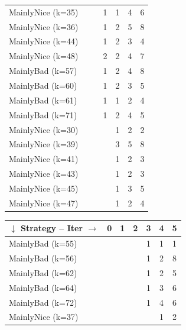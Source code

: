 \documentclass[journal,10pt,twoside]{IEEEtran}
\begin{document}
\begin{table}[ht]
\begin{minipage}{.4\textwidth}
\begin{tabular}{l|cccccc}
        MainlyNice (k=35)   &     &     &    1 &    1 &    4 &    6 \\
        MainlyNice (k=36)   &     &     &    1 &    2 &    5 &    8 \\
        MainlyNice (k=44)   &     &     &    1 &    2 &    3 &    4 \\
        MainlyNice (k=48)   &     &     &    2 &    2 &    4 &    7 \\
        MainlyBad (k=57)    &     &     &    1 &    2 &    4 &    8 \\
        MainlyBad (k=60)    &     &     &    1 &    2 &    3 &    5 \\
        MainlyBad (k=61)    &     &     &    1 &    1 &    2 &    4 \\
        MainlyBad (k=71)    &     &     &    1 &    2 &    4 &    5 \\
        MainlyNice (k=30)   &     &     &      &    1 &    2 &    2 \\
        MainlyNice (k=39)   &     &     &      &    3 &    5 &    8 \\
        MainlyNice (k=41)   &     &     &      &    1 &    2 &    3 \\
        MainlyNice (k=43)   &     &     &      &    1 &    2 &    3 \\
        MainlyNice (k=45)   &     &     &      &    1 &    3 &    5 \\
        MainlyNice (k=47)   &     &     &      &    1 &    2 &    4 \\ \bottomrule
    \end{tabular}
    \end{minipage} \quad
    \begin{minipage}{.4\textwidth}
    \begin{tabular}{l|cccccc} \toprule
        $\downarrow$ Strategy -- Iter $\rightarrow$ & 0 & 1 & 2 & 3 & 4 & 5 \\ \midrule
        MainlyBad (k=55)    &     &     &      &    1 &    1 &    1 \\
        MainlyBad (k=56)    &     &     &      &    1 &    2 &    8 \\
        MainlyBad (k=62)    &     &     &      &    1 &    2 &    5 \\
        MainlyBad (k=64)    &     &     &      &    1 &    3 &    6 \\
        MainlyBad (k=72)    &     &     &      &    1 &    4 &    6 \\
        MainlyNice (k=37)   &     &     &      &      &    1 &    2 \\

\end{tabular}
\end{minipage}
\end{table}
\end{document}
